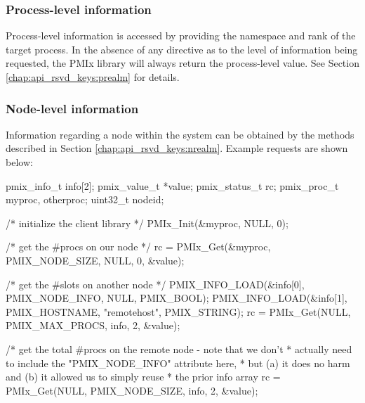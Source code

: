 \subsubsection{Process-level information}

Process-level information is accessed by providing the namespace and rank of the target process. In the absence of any directive as to the level of information being requested, the \ac{PMIx} library will always return the process-level value. See Section \ref{chap:api_rsvd_keys:prealm} for details.


\subsubsection{Node-level information}

Information regarding a node within the system can be obtained by the methods described in Section \ref{chap:api_rsvd_keys:nrealm}. Example requests are shown below:

\cspecificstart
\begin{codepar}
pmix_info_t info[2];
pmix_value_t *value;
pmix_status_t rc;
pmix_proc_t myproc, otherproc;
uint32_t nodeid;

/* initialize the client library */
PMIx_Init(&myproc, NULL, 0);

/* get the #procs on our node */
rc = PMIx_Get(&myproc, PMIX_NODE_SIZE, NULL, 0, &value);

/* get the #slots on another node */
PMIX_INFO_LOAD(&info[0], PMIX_NODE_INFO, NULL, PMIX_BOOL);
PMIX_INFO_LOAD(&info[1], PMIX_HOSTNAME, "remotehost", PMIX_STRING);
rc = PMIx_Get(NULL, PMIX_MAX_PROCS, info, 2, &value);

/* get the total #procs on the remote node - note that we don't
 * actually need to include the "PMIX_NODE_INFO" attribute here,
 * but (a) it does no harm and (b) it allowed us to simply reuse
 * the prior info array
rc = PMIx_Get(NULL, PMIX_NODE_SIZE, info, 2, &value);
\end{codepar}
\cspecificend

